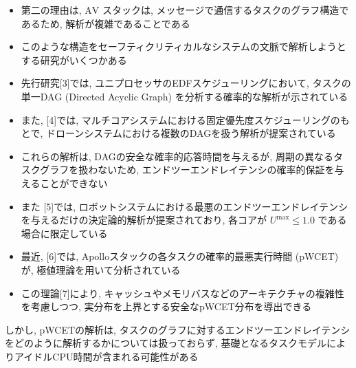 \begin{frame}{}
    \begin{itemize}
        \item 第二の理由は, $\mathrm{AV}$ スタックは, メッセージで通信するタスクのグラフ構造であるため, 解析が複雑であることである
        \item このような構造をセーフティクリティカルなシステムの文脈で解析しようとする研究がいくつかある
        \item 先行研究[3]では, ユニプロセッサのEDFスケジューリングにおいて, タスクの単一DAG (Directed Acyclic Graph) を分析する確率的な解析が示されている
        \item また, [4]では, マルチコアシステムにおける固定優先度スケジューリングのもとで, ドローンシステムにおける複数のDAGを扱う解析が提案されている
    \end{itemize}
\end{frame}

\begin{frame}{}
    \begin{itemize}
        \item これらの解析は, DAGの安全な確率的応答時間を与えるが, 周期の異なるタスクグラフを扱わないため, エンドツーエンドレイテンシの確率的保証を与えることができない
        \item また [5]では, ロボットシステムにおける最悪のエンドツーエンドレイテンシを与えるだけの決定論的解析が提案されており, 各コアが $U^{\max } \leq 1.0$ である場合に限定している
        \item 最近, [6]では, Apolloスタックの各タスクの確率的最悪実行時間 (pWCET) が, 極値理論を用いて分析されている
        \item この理論[7]により, キャッシュやメモリバスなどのアーキテクチャの複雑性を考慮しつつ, 実分布を上界とする安全なpWCET分布を導出できる
    \end{itemize}
\end{frame}

\begin{frame}{}
    しかし, pWCETの解析は, タスクのグラフに対するエンドツーエンドレイテンシをどのように解析するかについては扱っておらず, 基礎となるタスクモデルによりアイドルCPU時間が含まれる可能性がある
\end{frame}

